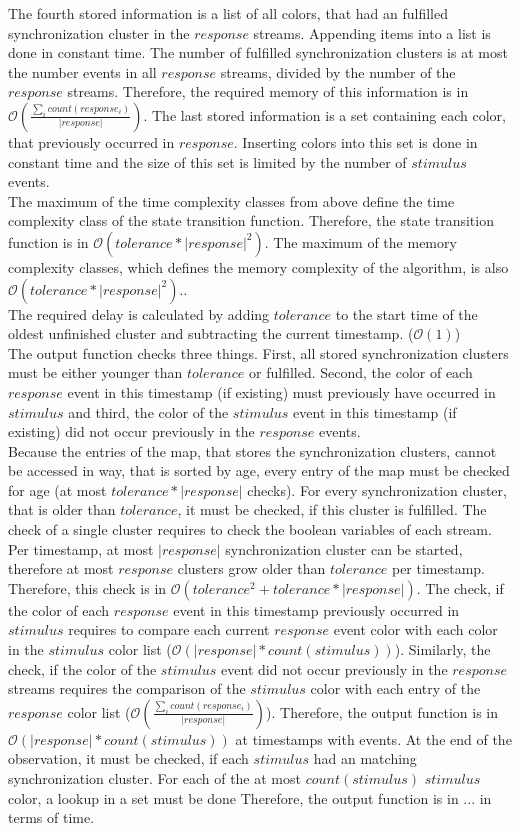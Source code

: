 	The fourth stored information is a list of all colors, that had an fulfilled synchronization cluster in the $response$ streams. Appending items into a list is done in constant time. The number of fulfilled synchronization clusters is at most the number events in all $response$ streams, divided by the number of the $response$ streams. Therefore, the required memory of this information is in $\mathcal{O}\left(\frac{\sum_i count(response_i)}{|response|}\right)$. The last stored information is a set containing each color, that previously occurred in $response$. Inserting colors into this set is done in constant time and the size of this set is limited by the number of $stimulus$ events.\\
	The maximum of the time complexity classes from above define the time complexity class of the state transition function. Therefore, the state transition function is in $\mathcal{O}(tolerance*|response|^2)$. The maximum of the memory complexity classes, which defines the memory complexity of the algorithm, is also $\mathcal{O}(tolerance*|response|^2)$..\\
	The required delay is calculated by adding $tolerance$ to the start time of the oldest unfinished cluster and subtracting the current timestamp. ($\mathcal{O}(1)$)\\
	The output function checks three things. First, all stored synchronization clusters must be either younger than $tolerance$ or fulfilled. Second, the color of each $response$ event in this timestamp (if existing) must previously have occurred in $stimulus$ and third, the color of the $stimulus$ event in this timestamp (if existing) did not occur previously in the $response$ events.\\
	Because the entries of the map, that stores the synchronization clusters, cannot be accessed in way, that is sorted by age, every entry of the map must be checked for age (at most $tolerance*|response|$ checks). For every synchronization cluster, that is older than $tolerance$, it must be checked, if this cluster is fulfilled. The check of a single cluster requires to check the boolean variables of each stream. Per timestamp, at most $|response|$ synchronization cluster can be started, therefore at most $response$ clusters grow older than $tolerance$ per timestamp. Therefore, this check is in $\mathcal{O}(tolerance^2+tolerance*|response|)$.
	The check, if the color of each $response$ event in this timestamp previously occurred in $stimulus$ requires to compare each current $response$ event color with each color in the $stimulus$ color list ($\mathcal{O}(|response|*count(stimulus))$). Similarly, the check, if the color of the $stimulus$ event did not occur previously in the $response$ streams requires the comparison of the $stimulus$ color with each entry of the $response$ color list ($\mathcal{O}\left(\frac{\sum_i count(response_i)}{|response|}\right)$). 
	Therefore, the output function is in $\mathcal{O}(|response|*count(stimulus))$ at timestamps with events. At the end of the observation, it must be checked, if each $stimulus$ had an matching synchronization cluster. For each of the at most $count(stimulus)$ $stimulus$ color, a lookup in a set must be done%
	Therefore, the output function is in ... in terms of time.

